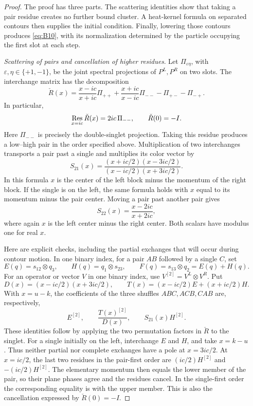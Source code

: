 \begin{proof}
The proof has three parts.  The scattering identities show that taking
a pair residue creates no further bound cluster.  A heat-kernel formula
on separated contours then supplies the initial condition.  Finally,
lowering those contours produces \eqref{eq:B10}, with its normalization
determined by the particle occupying the first slot at each step.

\emph{Scattering of pairs and cancellation of higher residues.}
Let \(\Pi_{\varepsilon\eta}\), with
\(\varepsilon,\eta\in\{+1,-1\}\), be the joint spectral projections of
\(P^L,P^R\) on two slots.  The interchange matrix has the decomposition
\[
 \check R(x)=
 \frac{x-ic}{x+ic}\Pi_{++}
 +\frac{x+ic}{x-ic}\Pi_{--}
 -\Pi_{+-}-\Pi_{-+}.
\]
In particular,
\[
 \mathop{\rm Res}_{x=ic}\check R(x)=2ic\,\Pi_{--},
 \qquad \check R(0)=-I.
\]
Here \(\Pi_{--}\) is precisely the double-singlet projection.  Taking
this residue produces a low--high pair in the order specified above.
Multiplication of two interchanges transports a pair past a single
and multiplies its color vector by
\begin{equation}
 S_{21}(x)=
 \frac{(x+ic/2)(x-3ic/2)}
      {(x-ic/2)(x+3ic/2)}.
\label{eq:bethe-pair-single}
\end{equation}
In this formula \(x\) is the center of the left block minus the
momentum of the right block.  If the single is on the left, the same
formula holds with \(x\) equal to its momentum minus the pair center.
Moving a pair past another pair gives
\begin{equation}
                       S_{22}(x)=\frac{x-2ic}{x+2ic},
\label{eq:bethe-pair-pair}
\end{equation}
where again \(x\) is the left center minus the right center.
Both scalars have modulus one for real \(x\).

Here are explicit checks, including the partial exchanges that will
occur during contour motion.  In one binary index, for a pair \(AB\)
followed by a single \(C\), set
\[
 E(q)=s_{12}\otimes q_3,\qquad
 H(q)=q_1\otimes s_{23},\qquad
 F(q)=s_{13}\otimes q_2=E(q)+H(q).
\]
For an operator or vector \(V\) in one binary index, use
\(V^{[2]}=V^L\otimes V^R\).  Put
\[
 D(x)=(x-ic/2)(x+3ic/2),\qquad
 T(x)=(x-ic/2)E+(x+ic/2)H.
\]
With \(x=u-k\), the coefficients of the three shuffles \(ABC,ACB,CAB\)
are, respectively,
\[
            E^{[2]},\qquad
            \frac{T(x)^{[2]}}{D(x)},\qquad
            S_{21}(x)H^{[2]}.
\]
These identities follow by applying the two permutation factors in
\(\check R\) to the singlet.  For a single initially on the left,
interchange \(E\) and \(H\), and take \(x=k-u\).  Thus neither partial
nor complete exchanges have a pole at \(x=3ic/2\).  At \(x=ic/2\),
the last two residues in the pair-first order are
\((ic/2)H^{[2]}\) and \(-(ic/2)H^{[2]}\).
The elementary momentum then equals the lower member of the pair,
so their plane phases agree and the residues cancel.  In the
single-first order the corresponding equality is with the upper
member.  This is also the cancellation expressed by
\(\check R(0)=-I\).


\end{proof}
